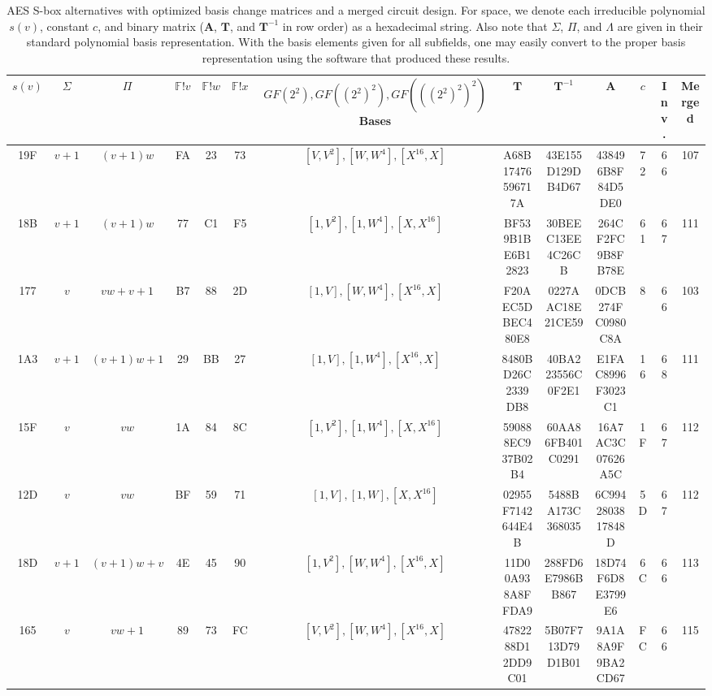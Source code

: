 \newpage
\begin{table}\label{tab:aesAlternatives2}
\tiny
    \caption{AES S-box alternatives with optimized basis change matrices and a merged circuit design. For space, we denote each irreducible polynomial $s(v)$, constant $c$, and binary matrix ($\mathbf{A}$, $\mathbf{T}$, and $\mathbf{T}^{-1}$ in row order) as a hexadecimal string. Also note that $\Sigma$, $\Pi$, and $\Lambda$ are given in their standard polynomial basis representation. With the basis elements given for all subfields, one may easily convert to the proper basis representation using the software that produced these results.}
    \begin{tabular}{|c|c|c|c|c|c|c|c|c|c|c|c|c|} \hline
    $s(v)$ & $\Sigma$ & $\Pi$ & $\mathbb{F}!v$ & $\mathbb{F}!w$ & $\mathbb{F}!x$ & $GF(2^2), GF((2^2)^2), GF(((2^2)^2)^2)$ Bases & $\mathbf{T}$ & $\mathbf{T}^{-1}$ & $\mathbf{A}$ & $c$ & Inv. & Merged \\ \hline
19F & $v + 1$ & $(v + 1)w$ & FA & 23 & 73 & $[V, V^2], [W, W^4], [X^{16}, X]$ & A68B17476596717A & 43E155D129DB4D67 & 438496B8F84D5DE0 & 72 & 66 &  107 \\
18B & $v + 1$ & $(v + 1)w$ & 77 & C1 & F5 & $[1, V^2], [1, W^4], [X, X^{16}]$ & BF539B1BE6B12823 & 30BEEC13EE4C26CB & 264CF2FC9B8FB78E & 61 & 67 &  111 \\
177 & $v$ & $vw + v + 1$ & B7 & 88 & 2D & $[1, V], [W, W^4], [X^{16}, X]$ & F20AEC5DBEC480E8 & 0227AAC18E21CE59 & 0DCB274FC0980C8A & 8 & 66 & 103 \\
1A3 & $v + 1$ & $(v + 1)w + 1$ & 29 & BB & 27 & $[1, V], [1, W^4], [X^{16}, X]$ & 8480BD26C2339DB8 & 40BA223556C0F2E1 & E1FAC8996F3023C1 & 16 & 68 &  111 \\
15F & $v$ & $vw$ & 1A & 84 & 8C & $[1, V^2], [1, W^4], [X, X^{16}]$ & 590888EC937B02B4 & 60AA86FB401C0291 & 16A7AC3C07626A5C & 1F & 67 &  112 \\
12D & $v$ & $vw$ & BF & 59 & 71 & $[1, V], [1, W], [X, X^{16}]$ & 02955F7142644E4B & 5488BA173C368035 & 6C9942803817848D & 5D & 67 &  112 \\
18D & $v + 1$ & $(v + 1)w + v$ & 4E & 45 & 90 & $[1, V^2], [W, W^4], [X^{16}, X]$ & 11D00A938A8FFDA9 & 288FD6E7986BB867 & 18D74F6D8E3799E6 & 6C & 66 &  113 \\
165 & $v$ & $vw + 1$ & 89 & 73 & FC & $[V, V^2], [W, W^4], [X^{16}, X]$ & 4782288D12DD9C01 & 5B07F713D79D1B01 & 9A1A8A9F9BA2CD67 & FC & 66 &  115 \\

\end{tabular}
\end{table}
